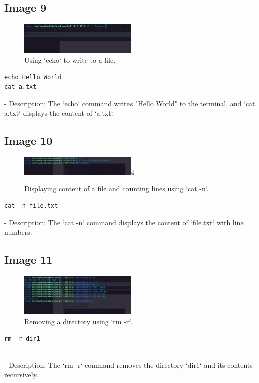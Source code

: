 \documentclass[12pt]{article}
\begin{document}
\subsection*{Image 9}
\begin{figure}[h!]
    \centering
    \includegraphics[width=0.5\textwidth]{9.png}
    \caption{Using `echo` to write to a file.}
\end{figure}
\begin{lstlisting}
echo Hello World
cat a.txt
\end{lstlisting}
- Description: The `echo` command writes "Hello World" to the terminal, and `cat a.txt` displays the content of `a.txt`.

\subsection*{Image 10}
\begin{figure}[h!]
    \centering
    \includegraphics[width=0.5\textwidth]{10.png}4
    \caption{Displaying content of a file and counting lines using `cat -n`.}
\end{figure}
\begin{lstlisting}
cat -n file.txt
\end{lstlisting}
- Description: The `cat -n` command displays the content of `file.txt` with line numbers.

\subsection*{Image 11}
\begin{figure}[h!]
    \centering
    \includegraphics[width=0.5\textwidth]{11.png}
    \caption{Removing a directory using `rm -r`.}
\end{figure}
\begin{lstlisting}
rm -r dir1


\end{lstlisting}
- Description: The `rm -r` command removes the directory `dir1` and its contents recursively.
\end{document}
